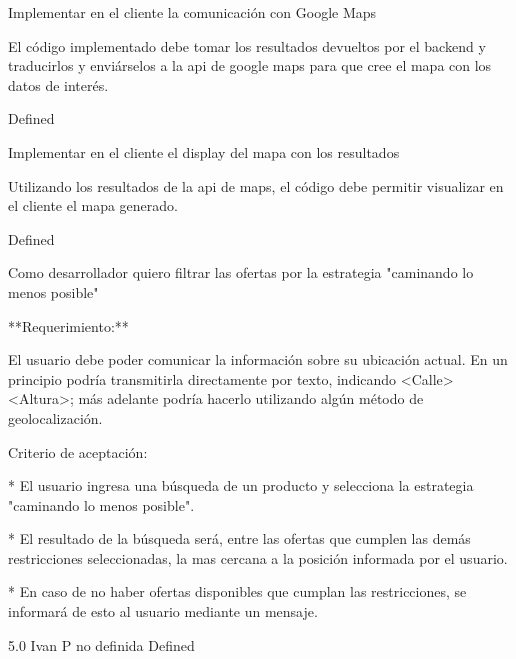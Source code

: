 		{Implementar en el cliente la comunicación con Google Maps} %
		{El código implementado debe tomar los resultados devueltos por el backend y
traducirlos y enviárselos a la api de google maps para que cree el mapa con
los datos de interés.

} %
		{} %
		{} %
		{} %
		{Defined} %

		{Implementar en el cliente el display del mapa con los resultados} %
		{Utilizando los resultados de la api de maps, el código debe permitir
visualizar en el cliente el mapa generado.

} %
		{} %
		{} %
		{} %
		{Defined} %


\vspace{20pt}

	{Como desarrollador quiero filtrar las ofertas por la estrategia "caminando lo menos posible"} %
	{**Requerimiento:**

El usuario debe poder comunicar la información sobre su ubicación actual. En
un principio podría transmitirla directamente por texto, indicando
<Calle><Altura>; más adelante podría hacerlo utilizando algún método de
geolocalización.

  

  

Criterio de aceptación:

  
* El usuario ingresa una búsqueda de un producto y selecciona la estrategia "caminando lo menos posible".  

* El resultado de la búsqueda será, entre las ofertas que cumplen las demás restricciones seleccionadas, la mas cercana a la posición informada por el usuario.

* En caso de no haber ofertas disponibles que cumplan las restricciones, se informará de esto al usuario mediante un mensaje. 

  

  

} %
	{} %
	{5.0} %
	{Ivan P} %
	{no definida} %
	{Defined} %


\vspace{20pt}

